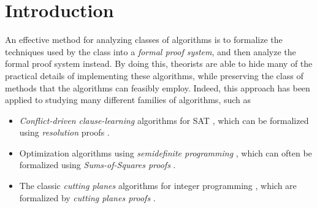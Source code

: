 \documentclass{toc}
\begin{document}
\begin{frontmatter}
\begin{abstract}
In this paper we make progress towards answering both of these questions. First, we show that \emph{any} Stabbing Planes proof with bounded coefficients ($\SP^*$) can be translated into Cutting Planes. As a consequence of the known lower bounds for Cutting Planes, this establishes the first exponential lower bounds on $\SP^*$. Using this translation, we extend the result of Dadush and Tiwari to show that Cutting Planes has short refutations of any unsatisfiable system of linear equations over a prime finite field. Like the Cutting Planes proofs of Dadush and Tiwari, our refutations also incur a quasi-polynomial blow-up in depth, and we conjecture that this is inherent. As a step towards this conjecture, we develop a new \emph{geometric} technique for proving lower bounds on the depth of Cutting Planes proofs. This allows us to establish the first lower bounds on the depth of \emph{Semantic} Cutting Planes proofs of the Tseitin formulas.
\end{abstract}

%

\end{frontmatter}

%
%
%

\section{Introduction}
\label{sec:intro}
%

An effective method for analyzing classes of algorithms is to formalize the techniques used by the class into a \emph{formal proof system}, and then analyze the formal proof system instead. 
By doing this, theorists are able to hide many of the practical details of implementing these algorithms, while preserving the class of methods that the algorithms can feasibly employ.
Indeed, this approach has been applied to %
studying  %
many different families of algorithms, such as 
\begin{itemize}
\item \emph{Conflict-driven clause-learning} algorithms for SAT
\cite{BayardoS97,MarquesS99,MoskewiczMZZM01}, 
which can be formalized using \emph{resolution} proofs \cite{DavisP60}.
	\item Optimization algorithms using \emph{semidefinite programming} \cite{Goemans1994,parrilo2000}, which can often be formalized using \emph{Sums-of-Squares proofs} \cite{dima-sos,BarakBHKSZ12}.
	\item The classic \emph{cutting planes} algorithms for integer programming \cite{gomory1963algorithm,Chvatal73a}, which are formalized by \emph{cutting planes proofs} \cite{Chvatal73a, Chvatal84, CookCT87}.
\end{itemize}
\end{document}

